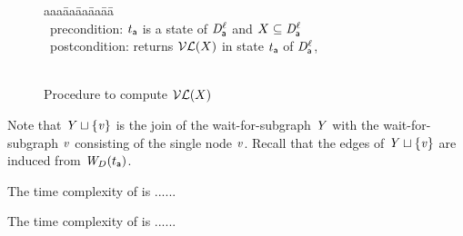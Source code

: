 \begin{figure}[H]
\setcounter{lctr}{0}
\begin{tabbing}\label{alg:compute-lfp}
aaa\= aa\= aa\= aa\= aa\=\kill
{}\\
\cmnt\ precondition: $t_\act$ is a state of $\dsk{\act}{\l}$ and $X \sub \dsk{\act}{\l}$\\
\cmnt\ postcondition: returns $\lVF{X}$ in state $t_\act$ of $\dsk{\act}{\l}$,\\
\\
\lio{\YS \gts \ewfg}

\lio{\FORALLC{\ndv \in \dsk{\act}{\l}}}




    \lit{\FI}
\lio{\ENDFOR;}
\lion{\RETURNE{\YS}}
\end{tabbing}
\caption{Procedure to compute $\lVF{X}$}
\label{fig:algcomputeVL}
\end{figure}

Note that $\YS \join \set{\ndv}$ is the join of the wait-for-subgraph $\YS$ with the 
wait-for-subgraph $\ndv$ consisting of the single node $\ndv$. Recall
that the edges of $\YS \join \set{\ndv}$ are induced from $\lwfg{B}{t_\act}{\DS}$.

The time complexity of  is ......

The time complexity of  is ......